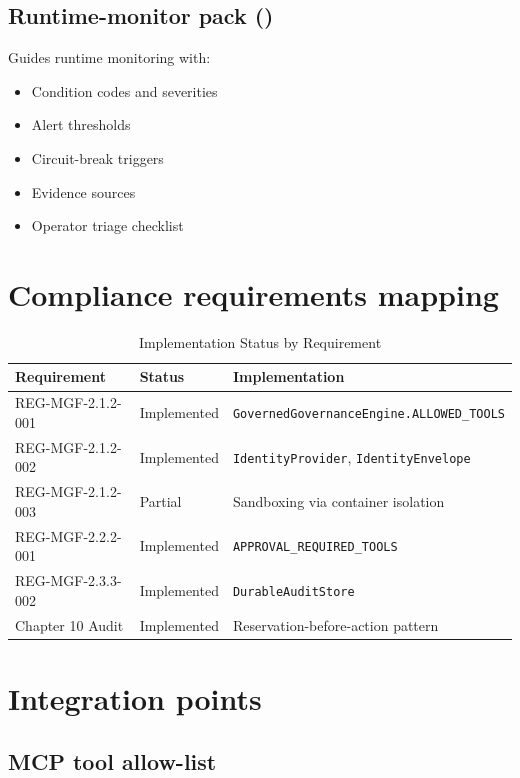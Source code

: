 \subsection{Runtime-monitor pack ()}

Guides runtime monitoring with:

\begin{itemize}
  \item Condition codes and severities
  \item Alert thresholds
  \item Circuit-break triggers
  \item Evidence sources
  \item Operator triage checklist
\end{itemize}

\section{Compliance requirements mapping}

\begin{table}[htbp]
\centering
\caption{Implementation Status by Requirement}
\label{tab:implementation-status}
\begin{tabularx}{\textwidth}{@{}l l X@{}}
\toprule
\textbf{Requirement} & \textbf{Status} & \textbf{Implementation} \\
\midrule
REG-MGF-2.1.2-001 & Implemented & \texttt{GovernedGovernanceEngine.ALLOWED\_TOOLS} \\
REG-MGF-2.1.2-002 & Implemented & \texttt{IdentityProvider}, \texttt{IdentityEnvelope} \\
REG-MGF-2.1.2-003 & Partial & Sandboxing via container isolation \\
REG-MGF-2.2.2-001 & Implemented & \texttt{APPROVAL\_REQUIRED\_TOOLS} \\
REG-MGF-2.3.3-002 & Implemented & \texttt{DurableAuditStore} \\
Chapter 10 Audit & Implemented & Reservation-before-action pattern \\
\bottomrule
\end{tabularx}
\end{table}

\section{Integration points}

\subsection{MCP tool allow-list}

